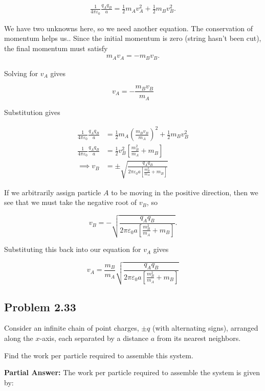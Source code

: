 \documentclass{article}
\begin{document}
\begin{align*}
    \frac{1}{4\pi\varepsilon_0} \frac{q_Aq_B}{a} = \frac{1}{2}m_Av_A^2 + \frac{1}{2}m_Bv_B^2.
\end{align*}

We have two unknowns here, so we need another equation. The conservation of momentum helps us.. Since the initial momentum is zero (string hasn't been cut), the final momentum must satisfy 
\begin{align*}
    m_Av_A = -m_Bv_B.
\end{align*}

Solving for $v_A$ gives 

$$
v_A = -\frac{m_Bv_B}{m_A}
$$

Substitution gives 

\begin{align*}
    \frac{1}{4\pi\varepsilon_0} \frac{q_Aq_B}{a} &= \frac{1}{2}m_A\left(\frac{m_Bv_B}{m_A} \right)^2 + \frac{1}{2}m_Bv_B^2 \\
    \frac{1}{4\pi\varepsilon_0} \frac{q_Aq_B}{a} &= \frac{1}{2}v_B^2 \left[\frac{m_B^2}{m_A} + m_B \right]\\
    \implies v_B &= \pm \sqrt{\frac{q_Aq_B}{2\pi\varepsilon_0a\left[\frac{m_B^2}{m_A} + m_B \right]}}
\end{align*}

\pagebreak

If we arbitrarily assign particle $A$ to be moving in the positive direction, then we see that we must take the negative root of $v_B$, so 

$$
v_B = -\sqrt{\frac{q_Aq_B}{2\pi\varepsilon_0a\left[\frac{m_B^2}{m_A} + m_B \right]}}.
$$

Substituting this back into our equation for $v_A$ gives 

$$
v_A = \frac{m_B}{m_A}\sqrt{\frac{q_Aq_B}{2\pi\varepsilon_0a\left[\frac{m_B^2}{m_A} + m_B \right]}}
$$

\newpage

\subsection*{Problem 2.33} Consider an infinite chain of point charges, \( \pm q \) (with alternating signs), arranged along the \( x \)-axis, each separated by a distance \( a \) from its nearest neighbors.

Find the work per particle required to assemble this system.

\textbf{Partial Answer:} The work per particle required to assemble the system is given by:
\end{document}
